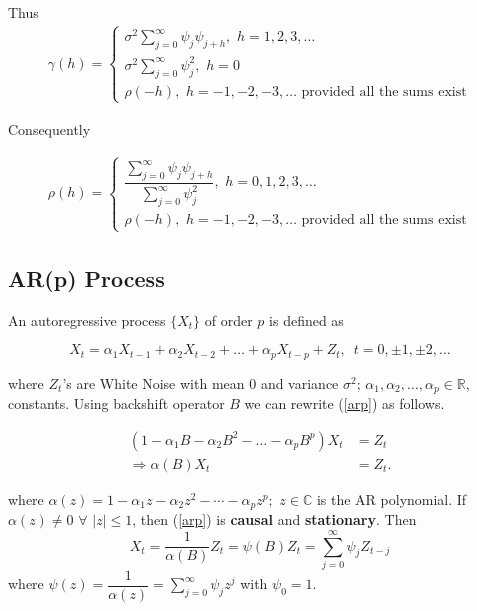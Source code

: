 \documentclass[11pt, a4paper]{article}
\numberwithin{equation}{section}
\theoremstyle{definition}
\begin{document}
Thus
\begin{align*}
\gamma(h) =
\begin{cases}
\sigma^2 \sum \limits_{j = 0}^{\infty} \psi_j \psi_{j+h}, \,\, h = 1, 2, 3, \ldots \\[1em]
\sigma^2 \sum \limits_{j = 0}^{\infty} \psi_{j}^{2}, \,\, h = 0 \\[1em]
\rho(-h), \,\, h = -1, -2, -3, \ldots \,\, \text{provided all the sums exist}
\end{cases}
\end{align*}

Consequently

\begin{align*}
\rho(h) =
\begin{cases}
\dfrac{\sum \limits_{j = 0}^{\infty} \psi_j \psi_{j+h}}{\sum \limits_{j = 0}^{\infty} \psi_{j}^{2}}, \,\, h = 0, 1, 2, 3, \ldots \\[1.5em]
\rho(-h), \,\, h = -1, -2, -3, \ldots \,\, \text{provided all the sums exist}
\end{cases}
\end{align*}

\subsection{AR(p) Process}

An autoregressive process $\{X_t\}$ of order $p$ is defined as

\begin{equation}\label{arp}
X_t = \alpha_1 X_{t-1} + \alpha_2 X_{t-2} + \ldots + \alpha_p X_{t-p} + Z_t, \,\,\, t = 0, \pm 1, \pm 2, \ldots
\end{equation}

where $Z_t$'s are White Noise with mean $0$ and variance $\sigma^2$; $\alpha_1, \alpha_2 , \ldots, \alpha_p \in \mathbb{R}$, constants. Using backshift operator $B$ we can rewrite (\ref{arp}) as follows.

\begin{align*}
\left(1 - \alpha_1 B - \alpha_2 B^2 - \ldots - \alpha_p B^p\right) X_t &= Z_t \\[0.2em]
\Rightarrow \alpha(B) X_t &= Z_t.
\end{align*}

where $\alpha(z) = 1 - \alpha_1 z - \alpha_2 z^2 - \cdots - \alpha_p z^p; \,\, z \in \mathbb{C}$ is the AR polynomial. If $\alpha(z) \neq 0$ $\forall$ $|z| \leq 1$, then (\ref{arp}) is \textbf{causal} and \textbf{stationary}. Then
\begin{equation} \label{arp_infinity_sum}
X_t = \dfrac{1}{\alpha(B)} Z_t = \psi(B) Z_t = \sum \limits_{j=0}^{\infty} \psi_j Z_{t-j}
\end{equation}
where $\psi(z) = \dfrac{1}{\alpha(z)} = \sum \limits_{j=0}^{\infty} \psi_j z^j$ with $\psi_0 = 1$. \\[0.2em]
\end{document}
